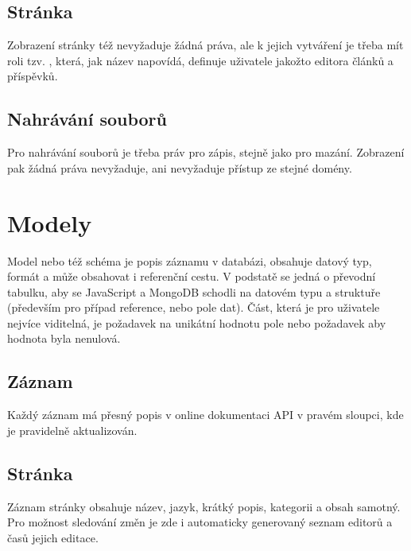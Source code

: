 \subsection{Stránka}
Zobrazení stránky též nevyžaduje žádná práva, ale k jejich vytváření je třeba mít roli tzv. , která,
jak název napovídá, definuje uživatele jakožto editora článků a příspěvků.

\subsection{Nahrávání souborů}
Pro nahrávání souborů je třeba práv pro zápis, stejně jako pro mazání.
Zobrazení pak žádná práva nevyžaduje, ani nevyžaduje přístup ze stejné domény.

\section{Modely}
Model nebo též schéma je popis záznamu v databázi, obsahuje datový typ, formát a může obsahovat i
referenční cestu. V podstatě se jedná o převodní tabulku, aby se JavaScript a MongoDB schodli na datovém typu a
struktuře (především pro případ reference, nebo pole dat). Část, která je pro uživatele nejvíce viditelná, je 
požadavek na unikátní hodnotu pole nebo požadavek aby hodnota byla nenulová.
\subsection{Záznam} 
Každý záznam má přesný popis v online dokumentaci API v pravém sloupci, kde je pravidelně aktualizován.
\subsection{Stránka}
Záznam stránky obsahuje název, jazyk, krátký popis, kategorii a obsah samotný.
Pro možnost sledování změn je zde i automaticky generovaný seznam editorů a časů jejich editace.
